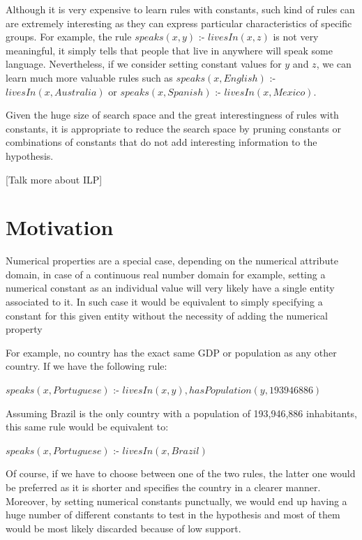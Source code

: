 Although it is very expensive to learn rules with constants, such kind of rules can are extremely interesting as they
can express particular characteristics of specific groups. For example, the rule $speaks(x,y)$ :- $livesIn(x,z)$ is not
very meaningful, it simply tells that people that live in anywhere will speak some language. Nevertheless, if we
consider setting constant values for $y$ and $z$, we can learn much more valuable rules such as
$speaks(x,English)$ :- $livesIn(x,Australia)$ or $speaks(x,Spanish)$ :- $livesIn(x,Mexico)$.

Given the huge size of search space and the great interestingness of rules with constants, it is appropriate to reduce
the search space by pruning constants or combinations of constants that do not add interesting information to the
hypothesis.

[Talk more about ILP]


\section{Motivation}

Numerical properties are a special case, depending on the numerical attribute
domain, in case of a continuous real number domain for example, setting a numerical constant as an individual value will
very likely have a single entity associated to it. In such case it would be equivalent to simply specifying a constant
for this given entity without the necessity of adding the numerical property

For example, no country has the exact same GDP or population as any other country. If we have the following rule:

\begin{center}
 $speaks(x,Portuguese)$ :- $livesIn(x,y),hasPopulation(y,193946886)$
\end{center}

Assuming Brazil is the only country with a population of 193,946,886 inhabitants, this same rule would be equivalent to:

\begin{center}
 $speaks(x,Portuguese)$ :- $livesIn(x,Brazil)$
\end{center}

Of course, if we have to choose between one of the two rules, the latter one would be preferred as it is shorter and
specifies the country in a clearer manner. Moreover, by setting numerical constants punctually, we would end up having a
huge number of different constants to test in the hypothesis and most of them would be most likely discarded because of
low support.

